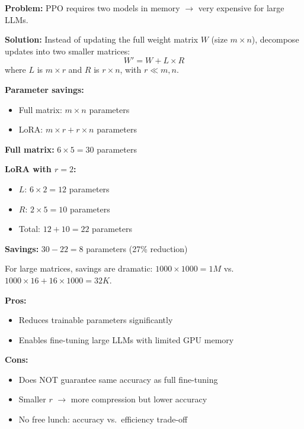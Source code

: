 \begin{defbox}[LoRA]
\textbf{Problem:} PPO requires two models in memory $\to$ very expensive for large LLMs.

\textbf{Solution:} Instead of updating the full weight matrix $W$ (size $m \times n$), decompose updates into two smaller matrices:
\[
W' = W + L \times R
\]
where $L$ is $m \times r$ and $R$ is $r \times n$, with $r \ll m, n$.

\textbf{Parameter savings:}
\begin{itemize}
  \item Full matrix: $m \times n$ parameters
  \item LoRA: $m \times r + r \times n$ parameters
\end{itemize}
\end{defbox}

\begin{exbox}
\textbf{Full matrix:} $6 \times 5 = 30$ parameters

\textbf{LoRA with $r = 2$:}
\begin{itemize}
  \item $L$: $6 \times 2 = 12$ parameters
  \item $R$: $2 \times 5 = 10$ parameters
  \item Total: $12 + 10 = 22$ parameters
\end{itemize}

\textbf{Savings:} $30 - 22 = 8$ parameters (27\% reduction)

For large matrices, savings are dramatic: $1000 \times 1000 = 1M$ vs.\ $1000 \times 16 + 16 \times 1000 = 32K$.
\end{exbox}

\begin{tipbox}
\textbf{Pros:}
\begin{itemize}
  \item Reduces trainable parameters significantly
  \item Enables fine-tuning large LLMs with limited GPU memory
\end{itemize}

\textbf{Cons:}
\begin{itemize}
  \item Does NOT guarantee same accuracy as full fine-tuning
  \item Smaller $r$ $\to$ more compression but lower accuracy
  \item No free lunch: accuracy vs.\ efficiency trade-off
\end{itemize}
\end{tipbox}

